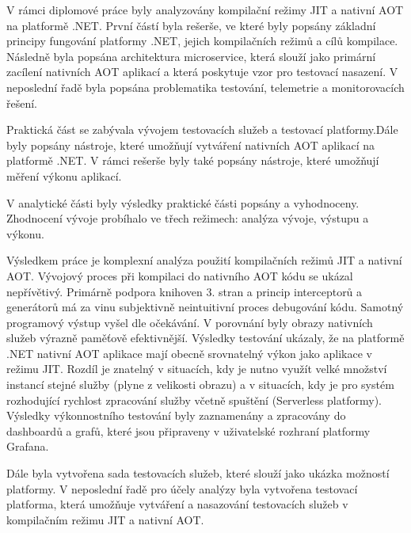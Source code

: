 
V rámci diplomové práce byly analyzovány kompilační režimy JIT a nativní AOT na platformě .NET. První částí byla rešerše, ve které byly popsány základní principy fungování platformy .NET, jejich kompilačních režimů a cílů kompilace. Následně byla popsána architektura microservice, která slouží jako primární zacílení nativních AOT aplikací a která poskytuje vzor pro testovací nasazení. V neposlední řadě byla popsána problematika testování, telemetrie a monitorovacích řešení.

Praktická část se zabývala vývojem testovacích služeb a testovací platformy.Dále byly popsány nástroje, které umožňují vytváření nativních AOT aplikací na platformě .NET. V rámci rešerše byly také popsány nástroje, které umožňují měření výkonu aplikací.

V analytické části byly výsledky praktické části popsány a vyhodnoceny. Zhodnocení vývoje probíhalo ve třech režimech: analýza vývoje, výstupu a výkonu.

Výsledkem práce je komplexní analýza použití kompilačních režimů JIT a nativní AOT. Vývojový proces při kompilaci do nativního AOT kódu se ukázal nepřívětivý. Primárně podpora knihoven 3. stran a princip interceptorů a generátorů má za vinu subjektivně neintuitivní proces debugování kódu. Samotný programový výstup vyšel dle očekávání. V porovnání byly obrazy nativních služeb výrazně paměťově efektivnější. Výsledky testování ukázaly, že na platformě .NET nativní AOT aplikace mají obecně srovnatelný výkon jako aplikace v režimu JIT. Rozdíl je znatelný v situacích, kdy je nutno využít velké množství instancí stejné služby (plyne z velikosti obrazu) a v situacích, kdy je pro systém rozhodující rychlost zpracování služby včetně spuštění (Serverless platformy). Výsledky výkonnostního testování byly zaznamenány a zpracovány do dashboardů a grafů, které jsou připraveny v uživatelské rozhraní platformy Grafana.

Dále byla vytvořena sada testovacích služeb, které slouží jako ukázka možností platformy. V neposlední řadě pro účely analýzy byla vytvořena testovací platforma, která umožňuje vytváření a nasazování testovacích služeb v kompilačním režimu JIT a nativní AOT.